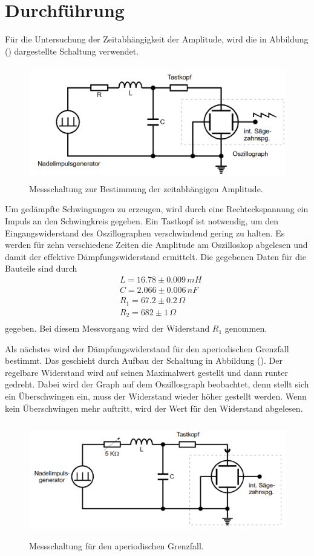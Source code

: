 \section{Durchführung}
\label{sec:Durchführung}

Für die Untersuchung der Zeitabhängigkeit der Amplitude, wird die in Abbildung () dargestellte Schaltung verwendet.

\begin{figure}[H]
  \centering
  \includegraphics[height=5cm]{Schaltung1.png}
  \caption{Messschaltung zur Bestimmung der zeitabhängigen Amplitude. \cite[S. 11]{kent}}
\end{figure}
\noindent Um gedämpfte Schwingungen zu erzeugen, wird durch eine Rechteckspannung ein Impuls an den Schwingkreis gegeben.
Ein Tastkopf ist notwendig, um den Eingangswiderstand des Oszillographen verschwindend gering zu halten. 
Es werden für zehn verschiedene Zeiten die Amplitude am Oszilloskop abgelesen und damit der effektive Dämpfungswiderstand ermittelt.
Die gegebenen Daten für die Bauteile sind durch 
\begin{align*}
&L = 16.78 \pm 0.009 \, mH \\
&C = 2.066 \pm 0.006 \, nF \\
&R_1 = 67.2 \pm 0.2 \, \Omega \\
&R_2 = 682 \pm 1 \, \Omega \\
\end{align*}
gegeben. Bei diesem Messvorgang wird der Widerstand $R_1$ genommen.


\noindent Als nächstes wird der Dämpfungswiderstand für den aperiodischen Grenzfall bestimmt. Das geschieht durch Aufbau der Schaltung in Abbildung ().
Der regelbare Widerstand wird auf seinen Maximalwert gestellt und dann runter gedreht. Dabei wird der Graph auf dem Oszillosgraph 
beobachtet, denn stellt sich ein Überschwingen ein, muss der Widerstand wieder höher gestellt werden. Wenn kein Überschwingen mehr
auftritt, wird der Wert für den Widerstand abgelesen.
\begin{figure}[H]
  \centering
  \includegraphics[height=5cm]{Schaltung2.png}
  \caption{Messschaltung für den aperiodischen Grenzfall. \cite[S. 11]{kent}}
\end{figure}

